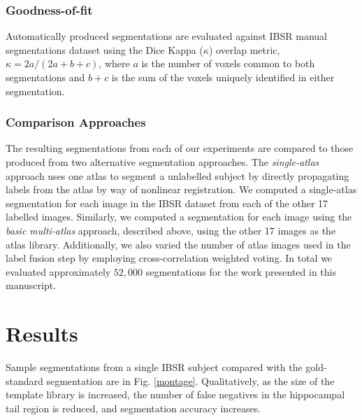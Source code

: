 \documentclass{article}\usepackage{graphicx, color}
\begin{document}
\subsubsection{Goodness-of-fit}
Automatically produced segmentations are evaluated against IBSR manual
segmentations dataset using the Dice Kappa ($\kappa$) overlap metric, $\kappa =
{2a}/{(2a+b+c)}$, where $a$ is the number of voxels common to both
segmentations and $b+c$ is the sum of the voxels uniquely identified in either
segmentation.

\subsubsection{Comparison Approaches}
The resulting segmentations from each of our experiments are compared to those
produced from two alternative segmentation approaches. The {\it single-atlas}
approach uses one atlas to segment a unlabelled subject by directly propagating
labels from the atlas by way of nonlinear registration.  We computed a
single-atlas segmentation for each image in the IBSR dataset from each of the
other 17 labelled images.  Similarly, we computed a segmentation for each image
using the {\it basic multi-atlas} approach, described above, using the
other 17 images as the atlas library.  Additionally, we also varied the number
of atlas images used in the label fusion step by employing cross-correlation
weighted voting.  In total we evaluated approximately $52,000$ segmentations
for the work presented in this manuscript.

\section{Results}

Sample segmentations from a single IBSR subject compared with the gold-standard
segmentation are in Fig.  \ref{montage}.  Qualitatively, as the size of the
template library is increased, the number of false negatives in the hippocampal
tail region is reduced, and segmentation accuracy increases.
\end{document}

